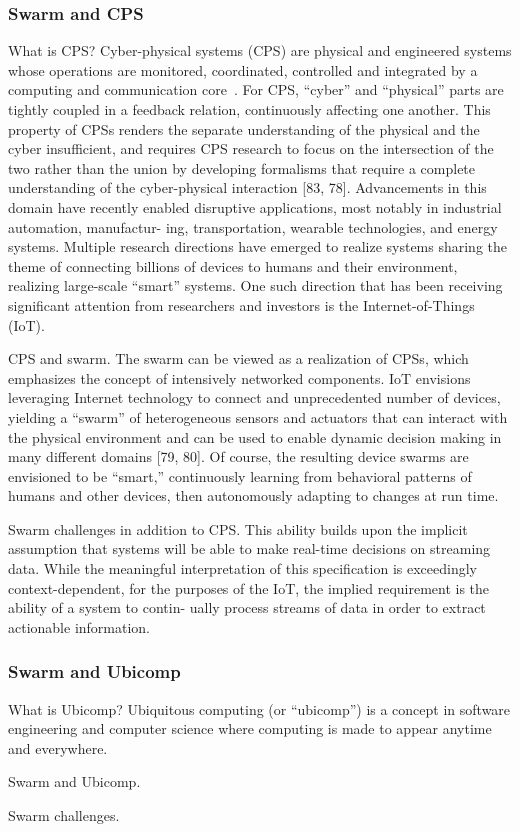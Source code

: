 \subsubsection{Swarm and CPS}
\label{sec:swarm-cps}

What is CPS? Cyber-physical systems (CPS) are physical and engineered systems
whose operations are monitored, coordinated, controlled and integrated by a
computing and communication core~\cite{rajkumar2010cyber}. For CPS, ``cyber''
and ``physical'' parts are tightly coupled in a feedback relation, continuously
affecting one another. This property of CPSs renders the separate understanding
of the physical and the cyber insufficient, and requires CPS research to focus
on the intersection of the two rather than the union by developing formalisms
that require a complete understanding of the cyber-physical interaction [83,
78]. Advancements in this domain have recently enabled disruptive applications,
most notably in industrial automation, manufactur- ing, transportation, wearable
technologies, and energy systems. Multiple research directions have emerged to
realize systems sharing the theme of connecting billions of devices to humans
and their environment, realizing large-scale ``smart'' systems. One such
direction that has been receiving significant attention from researchers and
investors is the Internet-of-Things (IoT).

CPS and swarm. The swarm can be viewed as a realization of CPSs, which
emphasizes the concept of intensively networked components. IoT envisions
leveraging Internet technology to connect and unprecedented number of devices,
yielding a ``swarm'' of heterogeneous sensors and actuators that can interact
with the physical environment and can be used to enable dynamic decision making
in many different domains [79, 80]. Of course, the resulting device swarms are
envisioned to be ``smart,'' continuously learning from behavioral patterns of
humans and other devices, then autonomously adapting to changes at run time.

Swarm challenges in addition to CPS. This ability builds upon the implicit
assumption that systems will be able to make real-time decisions on streaming
data. While the meaningful interpretation of this specification is exceedingly
context-dependent, for the purposes of the IoT, the implied requirement is the
ability of a system to contin- ually process streams of data in order to extract
actionable information.

\subsubsection{Swarm and Ubicomp}
\label{sec:swarm-wsn}

What is Ubicomp? Ubiquitous computing (or ``ubicomp'') is a concept in software
engineering and computer science where computing is made to appear anytime and
everywhere.

Swarm and Ubicomp.

Swarm challenges.

